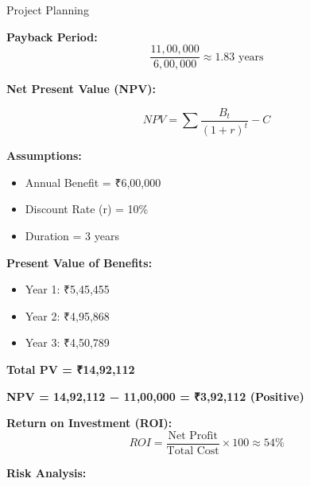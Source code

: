 \documentclass[11pt]{beamer}
\begin{document}
\begin{frame}[t, allowframebreaks]{Project Planning}
        \vspace{0.5cm}

        \textbf{Payback Period:}
        \[
            \frac{11,00,000}{6,00,000} \approx 1.83 \text{ years}
        \]


        \framebreak

        \textbf{Net Present Value (NPV):}

        \[
            NPV = \sum \frac{B_t}{(1 + r)^t} - C
        \]

        \textbf{Assumptions:}
        \begin{itemize}
            \item Annual Benefit = ₹6,00,000
            \item Discount Rate (r) = 10\%
            \item Duration = 3 years
        \end{itemize}

        \vspace{0.3cm}

        \textbf{Present Value of Benefits:}
        \begin{itemize}
            \item Year 1: ₹5,45,455
            \item Year 2: ₹4,95,868
            \item Year 3: ₹4,50,789
        \end{itemize}

        \textbf{Total PV = ₹14,92,112}

        \vspace{0.3cm}

        \textbf{NPV = 14,92,112 − 11,00,000 = ₹3,92,112 (Positive)}

        \vspace{0.5cm}

        \textbf{Return on Investment (ROI):}
        \[
            ROI = \frac{\text{Net Profit}}{\text{Total Cost}} \times 100 \approx 54\%
        \]

        \framebreak

        \textbf{\large Risk Analysis:}

        \\[20pt]


\end{frame}
\end{document}

